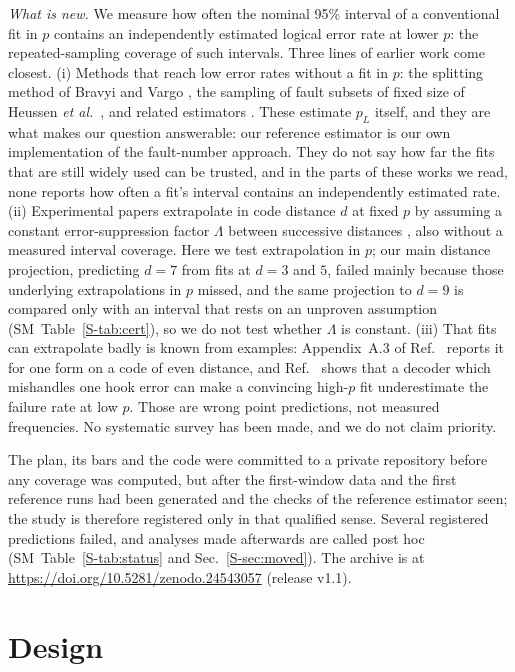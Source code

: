 \documentclass[aps,pre,twocolumn,superscriptaddress,nofootinbib,10pt]{revtex4-2}
\newcommand{\SM}{SM}
\newcommand{\pL}{p_L}
\begin{document}
\emph{What is new.} We measure how often the nominal 95\% interval of a conventional fit in $p$ contains an independently estimated logical error rate at lower $p$: the repeated-sampling coverage of such intervals. Three lines of earlier work come closest. (i) Methods that reach low error rates without a fit in $p$: the splitting method of Bravyi and Vargo \cite{bravyivargo2013,mayer2025}, the sampling of fault subsets of fixed size of Heussen \emph{et al.}\ \cite{heussen2024,ye2026}, and related estimators \cite{beverland2025,molavi2026}. These estimate $\pL$ itself, and they are what makes our question answerable: our reference estimator is our own implementation of the fault-number approach. They do not say how far the fits that are still widely used can be trusted, and in the parts of these works we read, none reports how often a fit's interval contains an independently estimated rate. (ii) Experimental papers extrapolate in code distance $d$ at fixed $p$ by assuming a constant error-suppression factor $\Lambda$ between successive distances \cite{google2023,google2025}, also without a measured interval coverage. Here we test extrapolation in $p$; our main distance projection, predicting $d=7$ from fits at $d=3$ and $5$, failed mainly because those underlying extrapolations in $p$ missed, and the same projection to $d=9$ is compared only with an interval that rests on an unproven assumption (\SM\ Table~\ref{S-tab:cert}), so we do not test whether $\Lambda$ is constant. (iii) That fits can extrapolate badly is known from examples: Appendix~A.3 of Ref.~\cite{beverland2025} reports it for one form on a code of even distance, and Ref.~\cite{mullan2026} shows that a decoder which mishandles one hook error can make a convincing high-$p$ fit underestimate the failure rate at low $p$. Those are wrong point predictions, not measured frequencies. No systematic survey has been made, and we do not claim priority.

The plan, its bars and the code were committed to a private repository before any coverage was computed, but after the first-window data and the first reference runs had been generated and the checks of the reference estimator seen; the study is therefore registered only in that qualified sense. Several registered predictions failed, and analyses made afterwards are called post hoc (\SM\ Table~\ref{S-tab:status} and Sec.~\ref{S-sec:moved}). The archive is at \url{https://doi.org/10.5281/zenodo.24543057} (release v1.1).

\section{Design}\label{sec:design}
\end{document}
